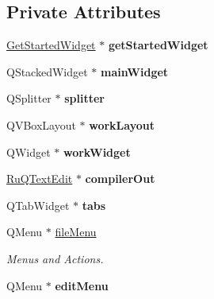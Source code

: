 \subsection*{Private Attributes}
\begin{DoxyCompactItemize}
\item 
\hypertarget{class_main_window_ab0d27cd951f836d48197c91349e02398}{}\hyperlink{class_get_started_widget}{Get\+Started\+Widget} $\ast$ {\bfseries get\+Started\+Widget}\label{class_main_window_ab0d27cd951f836d48197c91349e02398}

\item 
\hypertarget{class_main_window_ac789c1633000cdbf742f45f254ace59d}{}Q\+Stacked\+Widget $\ast$ {\bfseries main\+Widget}\label{class_main_window_ac789c1633000cdbf742f45f254ace59d}

\item 
\hypertarget{class_main_window_a392fb761a37795ee8081438c8c3493dd}{}Q\+Splitter $\ast$ {\bfseries splitter}\label{class_main_window_a392fb761a37795ee8081438c8c3493dd}

\item 
\hypertarget{class_main_window_abd2dd045cd4f4a425682e634515cee4a}{}Q\+V\+Box\+Layout $\ast$ {\bfseries work\+Layout}\label{class_main_window_abd2dd045cd4f4a425682e634515cee4a}

\item 
\hypertarget{class_main_window_aedb288ba31a9b42071fda2724afa8eb2}{}Q\+Widget $\ast$ {\bfseries work\+Widget}\label{class_main_window_aedb288ba31a9b42071fda2724afa8eb2}

\item 
\hypertarget{class_main_window_abbd98dca69e8cdc0aedf6330bc5a0960}{}\hyperlink{class_ru_q_text_edit}{Ru\+Q\+Text\+Edit} $\ast$ {\bfseries compiler\+Out}\label{class_main_window_abbd98dca69e8cdc0aedf6330bc5a0960}

\item 
\hypertarget{class_main_window_a7d5ec7879af0d224a6173a5565ea1ffd}{}Q\+Tab\+Widget $\ast$ {\bfseries tabs}\label{class_main_window_a7d5ec7879af0d224a6173a5565ea1ffd}

\item 
\hypertarget{class_main_window_a426da48f6e2f865b07a28533c07c4f7a}{}Q\+Menu $\ast$ \hyperlink{class_main_window_a426da48f6e2f865b07a28533c07c4f7a}{file\+Menu}\label{class_main_window_a426da48f6e2f865b07a28533c07c4f7a}

\begin{DoxyCompactList}\small\item\em Menus and Actions. \end{DoxyCompactList}\item 
\hypertarget{class_main_window_a5b05548b0849cd96a73ad5b38cc73bef}{}Q\+Menu $\ast$ {\bfseries edit\+Menu}\label{class_main_window_a5b05548b0849cd96a73ad5b38cc73bef}


\end{DoxyCompactItemize}
